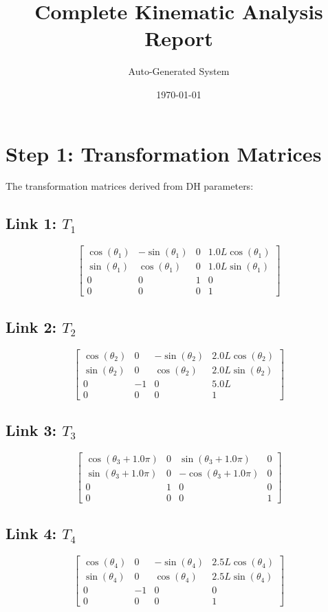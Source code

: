 \documentclass[12pt, a4paper]{article}
\title{\textbf{Complete Kinematic Analysis Report}}
\author{Auto-Generated System}
\date{\today}
\begin{document}
\maketitle
\tableofcontents
\newpage
\section{Step 1: Transformation Matrices}
The transformation matrices derived from DH parameters:
\subsection*{Link 1: $T_{1}$}
\[ \left[\begin{matrix}\cos{\left(\theta_{1} \right)} & - \sin{\left(\theta_{1} \right)} & 0 & 1.0 L \cos{\left(\theta_{1} \right)}\\\sin{\left(\theta_{1} \right)} & \cos{\left(\theta_{1} \right)} & 0 & 1.0 L \sin{\left(\theta_{1} \right)}\\0 & 0 & 1 & 0\\0 & 0 & 0 & 1\end{matrix}\right] \]
\subsection*{Link 2: $T_{2}$}
\[ \left[\begin{matrix}\cos{\left(\theta_{2} \right)} & 0 & - \sin{\left(\theta_{2} \right)} & 2.0 L \cos{\left(\theta_{2} \right)}\\\sin{\left(\theta_{2} \right)} & 0 & \cos{\left(\theta_{2} \right)} & 2.0 L \sin{\left(\theta_{2} \right)}\\0 & -1 & 0 & 5.0 L\\0 & 0 & 0 & 1\end{matrix}\right] \]
\subsection*{Link 3: $T_{3}$}
\[ \left[\begin{matrix}\cos{\left(\theta_{3} + 1.0 \pi \right)} & 0 & \sin{\left(\theta_{3} + 1.0 \pi \right)} & 0\\\sin{\left(\theta_{3} + 1.0 \pi \right)} & 0 & - \cos{\left(\theta_{3} + 1.0 \pi \right)} & 0\\0 & 1 & 0 & 0\\0 & 0 & 0 & 1\end{matrix}\right] \]
\subsection*{Link 4: $T_{4}$}
\[ \left[\begin{matrix}\cos{\left(\theta_{4} \right)} & 0 & - \sin{\left(\theta_{4} \right)} & 2.5 L \cos{\left(\theta_{4} \right)}\\\sin{\left(\theta_{4} \right)} & 0 & \cos{\left(\theta_{4} \right)} & 2.5 L \sin{\left(\theta_{4} \right)}\\0 & -1 & 0 & 0\\0 & 0 & 0 & 1\end{matrix}\right] \]
\end{document}
